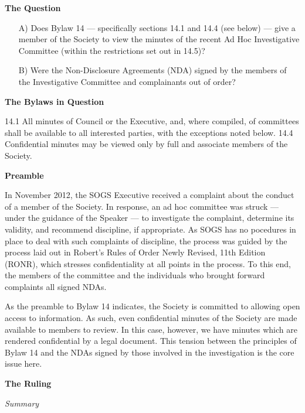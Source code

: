 \begin{multicols}{2}

\begin{longenum}[ label*=\arabic*., align=left]
\item \textbf{The Question}

\begin{itemize}
\item[A)] Does Bylaw 14 --- specifically sections 14.1 and 14.4 (see below) --- give a member of the Society to view the minutes of the recent Ad Hoc Investigative Committee (within the restrictions set out in 14.5)?
\item[B)]  Were the Non-Disclosure Agreements (NDA) signed by the members of the Investigative Committee and complainants out of order?
\end{itemize}

\item \textbf{The Bylaws in Question}

14.1 All minutes of Council or the Executive, and,  where compiled,  of committees shall be available to all interested parties, with the exceptions noted below.
14.4 Confidential minutes may be viewed only by full and associate members of the Society.

\item \textbf{Preamble}

In November 2012, the SOGS Executive received a complaint about the conduct of a member of the Society. In response, an ad hoc committee was struck --- under the guidance of the Speaker --- to investigate the complaint, determine its validity, and recommend discipline, if appropriate. As SOGS has no pocedures in place to deal with such complaints of discipline, the process was guided by the process laid out in Robert's Rules of Order Newly Revised, 11th Edition (RONR), which stresses confidentiality at all points in the process. To this end, the members of the committee and the individuals who brought forward complaints all signed NDAs.

As the preamble to Bylaw 14 indicates, the Society is committed to allowing open access to information. As such, even confidential minutes of the Society are made available to members to review. In this case, however, we have minutes which are rendered confidential by a legal document. This tension between the principles of Bylaw 14 and the NDAs signed by those involved in the investigation is the core issue here.

\item \textbf{The Ruling}
\begin{longenum}
\item \textit{Summary}


\end{longenum}
\end{longenum}
\end{multicols}
